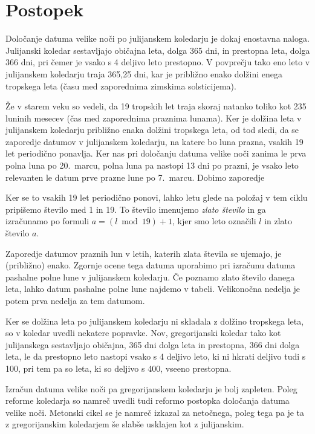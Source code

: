 \section{Postopek}

Določanje datuma velike noči po julijanskem koledarju je dokaj enostavna 
naloga. Julijanski koledar sestavljajo običajna leta, dolga 365 dni, in 
prestopna leta, dolga 366 dni, pri čemer je vsako s 4 deljivo leto 
prestopno. V povprečju tako eno leto v julijanskem koledarju traja 365,25
dni, kar je približno enako dolžini enega tropskega leta (času med 
zaporednima zimskima solsticijema). %

Že v starem veku so vedeli, da 19 tropskih let traja skoraj natanko toliko 
kot 235 luninih mesecev (čas med zaporednima praznima lunama). Ker je 
dolžina leta v julijanskem koledarju približno enaka dolžini tropskega leta, 
od tod sledi, da se zaporedje datumov v julijanskem koledarju, na katere bo 
luna prazna, vsakih 19 let periodično ponavlja. Ker nas pri določanju datuma
velike noči zanima le prva polna luna po 20.\ marcu, polna luna pa nastopi 
13 dni po prazni, je vsako leto relevanten le datum prve prazne lune po 7.\ 
marcu. Dobimo zaporedje %

Ker se to vsakih 19 let periodično ponovi, lahko letu glede na položaj v tem 
ciklu pripišemo število med 1 in 19. To število imenujemo \emph{zlato število} 
in ga izračunamo po formuli $a = (l \bmod 19) + 1$, kjer smo leto označili $l$ 
in zlato število $a$.

Zaporedje datumov praznih lun v letih, katerih zlata števila se ujemajo, je
(približno) enako. Zgornje ocene tega datuma uporabimo pri izračunu datuma 
pashalne polne lune v julijanskem koledarju. Če poznamo zlato število danega 
leta, lahko datum pashalne polne lune najdemo v tabeli. 
Velikonočna nedelja je potem prva nedelja za tem datumom.

Ker se dolžina leta po julijanskem koledarju ni skladala z dolžino tropskega
leta, so v koledar uvedli nekatere popravke. Nov, gregorijanski koledar tako
kot julijanskega sestavljajo običajna, 365 dni dolga leta in prestopna, 366
dni dolga leta, le da prestopno leto nastopi vsako s 4 deljivo leto, ki ni 
hkrati deljivo tudi s 100, pri tem pa so leta, ki so deljivo s 400, vseeno 
prestopna. 

Izračun datuma velike noči pa gregorijanskem koledarju je bolj zapleten. 
Poleg reforme koledarja so namreč uvedli tudi reformo postopka določanja 
datuma velike noči. Metonski cikel se je namreč izkazal za netočnega, poleg 
tega pa je ta z gregorijanskim koledarjem še slabše usklajen kot z julijanskim.

